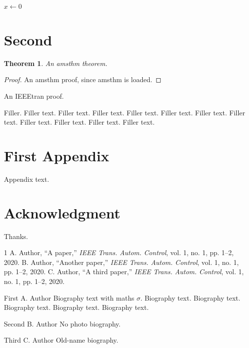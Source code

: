 \documentclass[journal,twoside,web]{ieeecomm}
\newtheorem{theorem}{Theorem}
\begin{document}
\begin{algorithm}[!t]
\caption{An algorithm}
\begin{algorithmic}
\STATE $x \leftarrow 0$
\end{algorithmic}
\end{algorithm}

\section{Second}
\label{sec:two}
\begin{theorem}
An amsthm theorem.
\end{theorem}
\begin{proof}
An amsthm proof, since amsthm is loaded.
\end{proof}
\begin{IEEEproof}
An IEEEtran proof.
\end{IEEEproof}
Filler. Filler text. Filler text. Filler text. Filler text. Filler text. Filler text. Filler text. Filler text. Filler text. Filler text. Filler text.

\appendices
\section{First Appendix}
Appendix text.

\section*{Acknowledgment}
Thanks.

\begin{thebibliography}{1}
 A. Author, ``A paper,'' \emph{IEEE Trans. Autom. Control}, vol. 1, no. 1, pp. 1--2, 2020.
 B. Author, ``Another paper,'' \emph{IEEE Trans. Autom. Control}, vol. 1, no. 1, pp. 1--2, 2020.
 C. Author, ``A third paper,'' \emph{IEEE Trans. Autom. Control}, vol. 1, no. 1, pp. 1--2, 2020.
\end{thebibliography}

\begin{IEEEbiography}[{\rule{1in}{1.25in}}]{First A. Author}
Biography text with maths $\sigma$. Biography text. Biography text. Biography text. Biography text. Biography text.
\end{IEEEbiography}
\begin{IEEEbiographynophoto}{Second B. Author}
No photo biography.
\end{IEEEbiographynophoto}
\begin{biography}{Third C. Author}
Old-name biography.
\end{biography}
\end{document}
